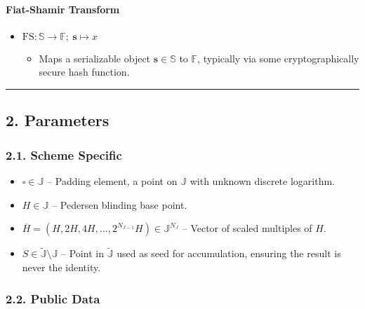 \documentclass[
]{article}
\providecommand{\tightlist}{%
  \setlength{\itemsep}{0pt}\setlength{\parskip}{0pt}}
\begin{document}
\hypertarget{fiat-shamir-transform}{%
\paragraph{Fiat-Shamir Transform}\label{fiat-shamir-transform}}

\begin{itemize}
\tightlist
\item
  \(\text{FS}: \mathbb{S} \to \mathbb{F};\ \textbf{s} \mapsto x\)

  \begin{itemize}
  \tightlist
  \item
    Maps a serializable object \(\textbf{s} \in \mathbb{S}\) to
    \(\mathbb{F}\), typically via some cryptographically secure hash
    function.
  \end{itemize}
\end{itemize}

\begin{center}\rule{0.5\linewidth}{0.5pt}\end{center}

\hypertarget{parameters}{%
\subsection{2. Parameters}\label{parameters}}

\hypertarget{scheme-specific}{%
\subsubsection{2.1. Scheme Specific}\label{scheme-specific}}

\begin{itemize}
\tightlist
\item
  \(\square \in \mathbb{J}\) -- Padding element, a point on
  \(\mathbb{J}\) with unknown discrete logarithm.
\item
  \(H \in \mathbb{J}\) -- Pedersen blinding base point.
\item
  \(\overline{H} = (H, 2H, 4H, \ldots, 2^{N_{J-1}}H) \in \mathbb{J}^{N_J}\)
  -- Vector of scaled multiples of \(H\).
\item
  \(S \in \tilde{\mathbb{J}} \setminus \mathbb{J}\) -- Point in
  \(\tilde{\mathbb{J}}\) used as seed for accumulation, ensuring the
  result is never the identity.
\end{itemize}

\hypertarget{public-data}{%
\subsubsection{2.2. Public Data}\label{public-data}}
\end{document}
